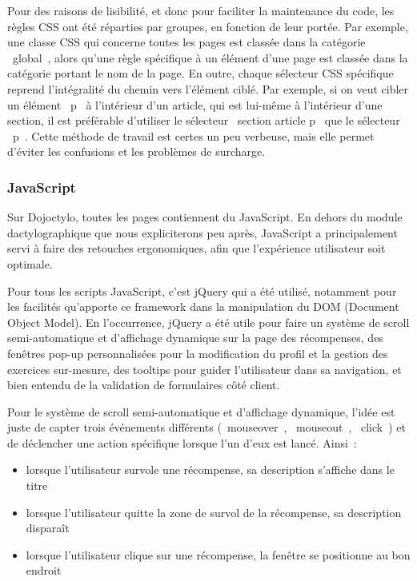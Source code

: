\documentclass[a4paper,12pt]{article}
\begin{document}
Pour des raisons de lisibilité, et donc pour faciliter la maintenance du code, les règles CSS ont été réparties par groupes, en fonction de leur portée. Par exemple, une classe CSS qui concerne toutes les pages est classée dans la catégorie \og~global~\fg, alors qu'une règle spécifique à un élément d'une page est classée dans la catégorie portant le nom de la page. En outre, chaque sélecteur CSS spécifique reprend l'intégralité du chemin vers l'élément ciblé. Par exemple, si on veut cibler un élément \og~p~\fg{} à l'intérieur d'un article, qui est lui-même à l'intérieur d'une section, il est préférable d'utiliser le sélecteur \og~section article p~\fg{} que le sélecteur \og~p~\fg. Cette méthode de travail est certes un peu verbeuse, mais elle permet d'éviter les confusions et les problèmes de surcharge.

\subsubsection{JavaScript}

Sur Dojoctylo, toutes les pages contiennent du JavaScript. En dehors du module dactylographique que nous expliciterons peu après, JavaScript a principalement servi à faire des retouches ergonomiques, afin que l'expérience utilisateur soit optimale.

Pour tous les scripts JavaScript, c'est jQuery qui a été utilisé, notamment pour les facilités qu'apporte ce framework dans la manipulation du DOM (Document Object Model). En l'occurrence, jQuery a été utile pour faire un système de scroll semi-automatique et d'affichage dynamique sur la page des récompenses, des fenêtres pop-up personnalisées pour la modification du profil et la gestion des exercices sur-mesure, des tooltips pour guider l'utilisateur dans sa navigation, et bien entendu de la validation de formulaires côté client.

Pour le système de scroll semi-automatique et d'affichage dynamique, l'idée est juste de capter trois événements différents (\og~mouseover~\fg, \og~mouseout~\fg, \og~click~\fg) et de déclencher une action spécifique lorsque l'un d'eux est lancé. Ainsi~: 

\begin{itemize}
 \item{lorsque l'utilisateur survole une récompense, sa description s'affiche dans le titre}
 \item{lorsque l'utilisateur quitte la zone de survol de la récompense, sa description disparaît}
 \item{lorsque l'utilisateur clique sur une récompense, la fenêtre se positionne au bon endroit}
\end{itemize}
\end{document}
